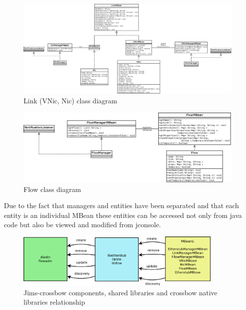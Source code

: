 \documentclass[11pt]{book}
\begin{document}
        \begin{figure}[H]
          \begin{center}
            \includegraphics[width=1.2\textwidth, angle=90]{img/impl/link.png}
          \end{center}
          \caption{Link (VNic, Nic) class diagram}
        \end{figure}        

        \begin{figure}[H]
          \begin{center}
            \includegraphics[width=1.2\textwidth, angle=90]{img/impl/flow.png}
          \end{center}
          \caption{Flow class diagram}
        \end{figure}        

		Due to the fact that managers and entities have been separated and that each entity is an individual MBean these
		entities can be accessed not only from java code but also be viewed and modified from jconsole.

		\begin{figure}[H]
			\begin{center}
			\includegraphics[width=0.9\textwidth]{img/impl/crossbowLibsDiagram.pdf}
			\end{center}
			\caption{Jims-crossbow components, shared libraries and crossbow native libraries relationship}
		\end{figure} 
		
\end{document}
